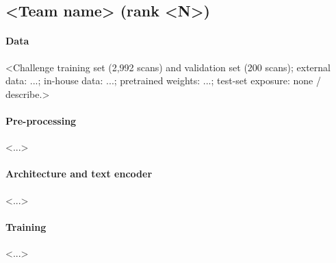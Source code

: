 
\subsection{<Team name> (rank <N>)}
\label{app:<teamname>}

\paragraph{Data} <Challenge training set (2,992 scans) and validation set (200 scans); external data: ...; in-house data: ...; pretrained weights: ...; test-set exposure: none / describe.>

\paragraph{Pre-processing} <...>

\paragraph{Architecture and text encoder} <...>

\paragraph{Training} <...>

